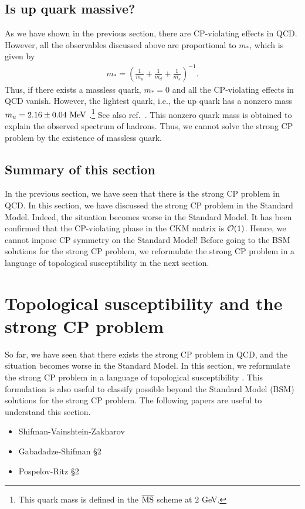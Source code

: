 \documentclass[11pt,a4paper]{article}
\begin{document}
\subsection{Is up quark massive?}
As we have shown in the previous section, there are CP-violating effects in QCD. However, all the observables discussed above are proportional to $m_*$, which is given by
\begin{align}
    m_* = \left( \frac{1}{m_u} + \frac{1}{m_d} + \frac{1}{m_s} \right)^{-1}.
\end{align}
Thus, if there exists a massless quark, $m_*=0$ and all the CP-violating effects in QCD vanish. 
However, the lightest quark, i.e., the up quark has a nonzero mass $m_u = 2.16 \pm 0.04~{\rm MeV}$ \cite{ParticleDataGroup:2024cfk}.\footnote{This quark mass is defined in the $\overline{\rm MS}$ scheme at $2$ GeV.} See also ref.~\cite{Alexandrou:2020bkd}. This nonzero quark mass is obtained to explain the observed spectrum of hadrons. Thus, we cannot solve the strong CP problem by the existence of massless quark.

\subsection{Summary of this section}
In the previous section, we have seen that there is the strong CP problem in QCD.
In this section, we have discussed the strong CP problem in the Standard Model. Indeed, the situation becomes worse in the Standard Model. 
It has been confirmed that the CP-violating phase in the CKM matrix is ${\cal O}(1)$. Hence, we cannot impose CP symmetry on the Standard Model!
Before going to the BSM solutions for the strong CP problem, we reformulate the strong CP problem in a language of topological susceptibility in the next section.

\section{Topological susceptibility and the strong CP problem}\label{sec:topological susceptibility}
So far, we have seen that there exists the strong CP problem in QCD, and the situation becomes worse in the Standard Model. In this section, we reformulate the strong CP problem in a language of topological susceptibility \cite{Shifman:1979if}. This formulation is also useful to classify possible beyond the Standard Model (BSM) solutions for the strong CP problem.
The following papers are useful to understand this section.
\begin{itemize}
\item Shifman-Vainshtein-Zakharov \cite{Shifman:1979if}
\item Gabadadze-Shifman \cite{Gabadadze:2002ff} \S 2
\item Pospelov-Ritz \cite{Pospelov:2005pr} \S 2
\end{itemize}
\end{document}
